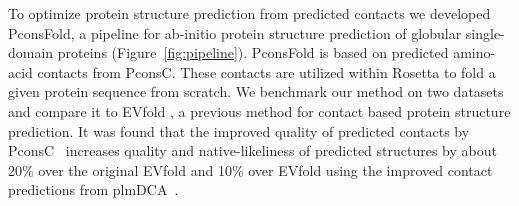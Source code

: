 \documentclass{bioinfo}
\begin{document}
To optimize protein structure prediction from predicted contacts we
developed PconsFold, a pipeline for ab-initio protein structure
prediction of globular single-domain proteins
(Figure~\ref{fig:pipeline}). PconsFold is based on predicted
amino-acid contacts from PconsC. These contacts are utilized within
Rosetta to fold a given protein sequence from scratch. We benchmark
our method on two datasets and compare it to EVfold
\cite[]{marks_protein_2011}, a previous method for contact based
protein structure prediction. It was found that the improved quality of predicted contacts
by PconsC~\cite{skwark_PconsC:_2013} increases quality and
native-likeliness of predicted structures by about 20\% over the
original EVfold and 10\% over EVfold using the improved contact
predictions from plmDCA~\cite{ekeberg_improved_2013}.
\end{document}
